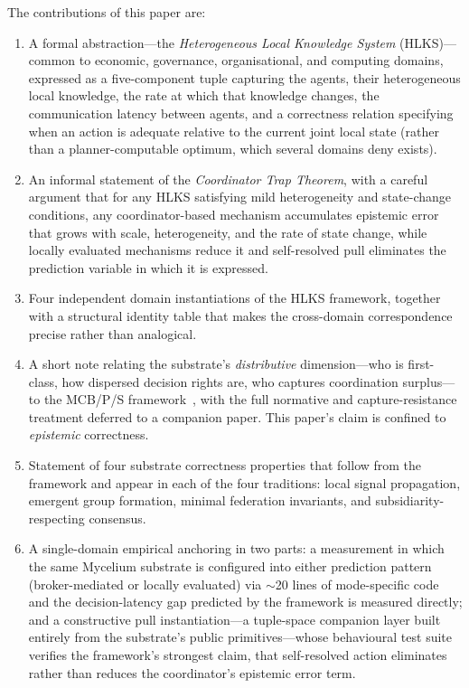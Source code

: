 \documentclass[11pt]{article}
\theoremstyle{definition}
\theoremstyle{plain}
\theoremstyle{plain}
\begin{document}
The contributions of this paper are:

\begin{enumerate}
\item A formal abstraction---the \emph{Heterogeneous Local Knowledge System}
  (HLKS)---common to economic, governance, organisational, and computing
  domains, expressed as a five-component tuple capturing the agents, their
  heterogeneous local knowledge, the rate at which that knowledge changes, the
  communication latency between agents, and a correctness relation specifying when
  an action is adequate relative to the current joint local state (rather than a
  planner-computable optimum, which several domains deny exists).

\item An informal statement of the \emph{Coordinator Trap Theorem}, with a
  careful argument that for any HLKS satisfying mild heterogeneity and
  state-change conditions, any coordinator-based mechanism accumulates
  epistemic error that grows with scale, heterogeneity, and the rate of
  state change, while locally evaluated mechanisms reduce it and self-resolved pull
  eliminates the prediction variable in which it is expressed.

\item Four independent domain instantiations of the HLKS framework, together
  with a structural identity table that makes the cross-domain correspondence
  precise rather than analogical.

\item A short note relating the substrate's \emph{distributive} dimension---who is
  first-class, how dispersed decision rights are, who captures coordination
  surplus---to the MCB/P/S framework~\cite{nicholson2025}, with the full normative
  and capture-resistance treatment deferred to a companion paper. This paper's claim
  is confined to \emph{epistemic} correctness.

\item Statement of four substrate correctness properties that follow from
  the framework and appear in each of the four traditions: local signal
  propagation, emergent group formation, minimal federation invariants, and
  subsidiarity-respecting consensus.

\item A single-domain empirical anchoring in two parts: a measurement in
  which the same Mycelium substrate is configured into either prediction
  pattern (broker-mediated or locally evaluated) via $\sim$20 lines of
  mode-specific code and the decision-latency gap predicted by the
  framework is measured directly; and a constructive pull
  instantiation---a tuple-space companion layer built entirely from the
  substrate's public primitives---whose behavioural test suite verifies
  the framework's strongest claim, that self-resolved action eliminates
  rather than reduces the coordinator's epistemic error term.


\end{enumerate}
\end{document}
